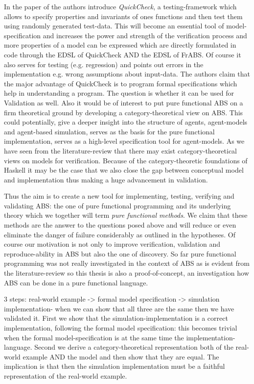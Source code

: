 In the paper of \cite{claessen_quickcheck:_2000} the authors introduce \textit{QuickCheck}, a testing-framework which allows to specify properties and invariants of ones functions and then test them using randomly generated test-data. This will become an essential tool of model-specification and increases the power and strength of the verification process and more properties of a model can be expressed which are directly formulated in code through the EDSL of QuickCheck AND the EDSL of FrABS. Of course it also serves for testing (e.g. regression) and points out errors in the implementation e.g. wrong assumptions about input-data. The authors claim that the major advantage of QuickCheck is to program formal specifications which help in understanding a program. The question is whether it can be used for Validation as well.
Also it would be of interest to put pure functional ABS on a firm theoretical ground by developing a category-theoretical view on ABS. This could potentially, give a deeper insight into the structure of agents, agent-models and agent-based simulation, serves as the basis for the pure functional implementation, serves as a high-level specification tool for agent-models.
As we have seen from the literature-review that there may exist category-theoretical views on models for verification. Because of the category-theoretic foundations of Haskell it may be the case that we also close the gap between conceptual model and implementation thus making a huge advancement in validation.

Thus the aim is to create a new tool for implementing, testing, verifying and validating ABS: the one of pure functional programming and its underlying theory which we together will term \textit{pure functional methods}. We claim that these methods are the answer to the questions posed above and will reduce or even eliminate the danger of failure considerably as outlined in the hypotheses. 
Of course our motivation is not only to improve verification, validation and reproduce-ability in ABS but also the one of discovery. So far pure functional programming was not really investigated in the context of ABS as is evident from the literature-review so this thesis is also a proof-of-concept, an investigation how ABS can be done in a pure functional language.

3 steps: real-world example -> formal model specification -> simulation implementation- when we can show that all three are the same then we have validated it. First we show that the simulation-implementation is a correct implementation, following the formal model specification: this becomes trivial when the formal model-specification is at the same time the implementation-language. Second we derive a category-theoretical representation both of the real-world example AND the model and then show that they are equal. The implication is that then the simulation implementation must be a faithful representation of the real-world example.

